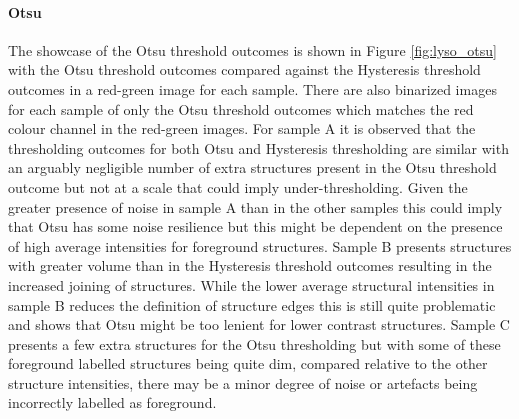 \paragraph{Otsu} The showcase of the Otsu threshold outcomes is shown in Figure \ref{fig:lyso_otsu} with the Otsu threshold outcomes compared against the Hysteresis threshold outcomes in a red-green image for each sample. There are also binarized images for each sample of only the Otsu threshold outcomes which matches the red colour channel in the red-green images.
For sample A it is observed that the thresholding outcomes for both Otsu and Hysteresis thresholding are similar with an arguably negligible number of extra structures present in the Otsu threshold outcome but not at a scale that could imply under-thresholding. Given the greater presence of noise in sample A than in the other samples this could imply that Otsu has some noise resilience but this might be dependent on the presence of high average intensities for foreground structures. Sample B presents structures with greater volume than in the Hysteresis threshold outcomes resulting in the increased joining of structures. While the lower average structural intensities in sample B reduces the definition of structure edges this is still quite problematic and shows that Otsu might be too lenient for lower contrast structures. Sample C presents a few extra structures for the Otsu thresholding but with some of these foreground labelled structures being quite dim, compared relative to the other structure intensities, there may be a minor degree of noise or artefacts being incorrectly labelled as foreground.
